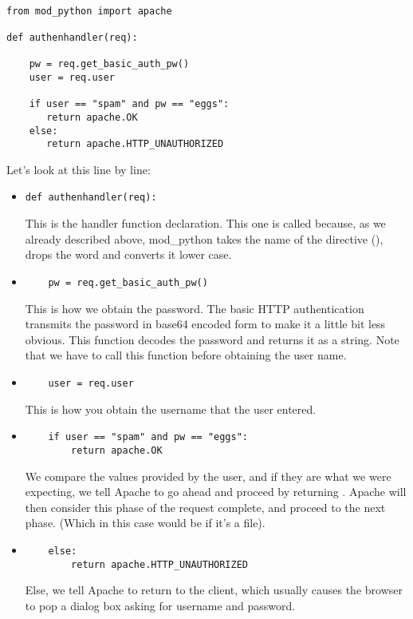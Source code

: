 \begin{verbatim}

from mod_python import apache

def authenhandler(req):

    pw = req.get_basic_auth_pw()
    user = req.user

    if user == "spam" and pw == "eggs":
       return apache.OK
    else:
       return apache.HTTP_UNAUTHORIZED
\end{verbatim}  

Let's look at this line by line: 

\begin{itemize}

\item
  \begin{verbatim}
def authenhandler(req):
  \end{verbatim}

  This is the handler function declaration. This one is called
   because, as we already described above,
  mod_python takes the name of the directive
  (), drops the word  and converts
  it lower case.

\item
  \begin{verbatim}
    pw = req.get_basic_auth_pw()
  \end{verbatim}
  
  This is how we obtain the password. The basic HTTP authentication
  transmits the password in base64 encoded form to make it a little
  bit less obvious. This function decodes the password and returns it
  as a string. Note that we have to call this function before obtaining
  the user name.

\item
  \begin{verbatim}
    user = req.user
  \end{verbatim}
  
  This is how you obtain the username that the user entered. 

\item
  \begin{verbatim}
    if user == "spam" and pw == "eggs":
        return apache.OK
  \end{verbatim}

  We compare the values provided by the user, and if they are what we
  were expecting, we tell Apache to go ahead and proceed by returning
  . Apache will then consider this phase of the
  request complete, and proceed to the next phase. (Which in this case
  would be  if it's a  file).

\item
  \begin{verbatim}
    else:
        return apache.HTTP_UNAUTHORIZED 
  \end{verbatim}

  Else, we tell Apache to return  to the
  client, which usually causes the browser to pop a dialog box asking
  for username and password.

\end{itemize}

